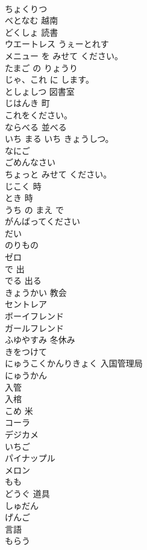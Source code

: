 \documentclass[8pt]{extreport}
\begin{document}
\begin{CJK}{UTF8}{min}
\\	ちょくりつ	
\\	べとなむ	越南
\\	どくしょ	読書
\\	ウエートレス	うぇーとれす
\\	メニュー を みせて ください。	
\\	たまご の りょうり	
\\	じゃ、これ に します。	
\\	としょしつ	図書室
\\	じはんき	町
\\	これをください。	
\\	ならべる	並べる
\\	いち まる いち きょうしつ。	
\\	なにご	
\\	ごめんなさい	
\\	ちょっと みせて ください。	
\\	じこく	時
\\	とき	時
\\	うち の まえ で	
\\	がんばってください	
\\	だい	
\\	のりもの	
\\	ゼロ	
\\	で	出
\\	でる	出る
\\	きょうかい	教会
\\	セントレア	
\\	ボーイフレンド	
\\	ガールフレンド	
\\	ふゆやすみ	冬休み
\\	きをつけて	
\\	にゅうこくかんりきょく	入国管理局
\\	にゅうかん	
\\	入管 
\\	入棺
\\	こめ	米
\\	コーラ	
\\	デジカメ	
\\	いちご	
\\	パイナップル	
\\	メロン	
\\	もも	
\\	どうぐ	道具
\\	しゅだん	
\\	げんご	
\\	言語
\\	もらう	

\end{CJK}
\end{document}
